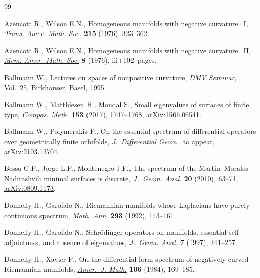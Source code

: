 \documentclass[pdftex]{sigma}
\numberwithin{equation}{section}
\begin{document}
\begin{thebibliography}{99}
\footnotesize\itemsep=0pt

Azencott R., Wilson E.N., Homogeneous manifolds with negative curvature.~{I},
 \href{https://doi.org/10.2307/1999731}{\textit{Trans. Amer. Math. Soc.}} \textbf{215} (1976), 323--362.

Azencott R., Wilson E.N., Homogeneous manifolds with negative curvature.~{II},
 \href{https://doi.org/10.1090/memo/0178}{\textit{Mem. Amer. Math. Soc.}} \textbf{8} (1976), iii+102~pages.

Ballmann W., Lectures on spaces of nonpositive curvature, \textit{DMV Seminar},
 Vol.~25, \href{https://doi.org/10.1007/978-3-0348-9240-7}{{Birkh\"auser}}, Basel, 1995.

Ballmann W., Matthiesen H., Mondal S., Small eigenvalues of surfaces of finite
 type, \href{https://doi.org/10.1112/S0010437X17007291}{\textit{Compos. Math.}} \textbf{153} (2017), 1747--1768,
 \href{https://arxiv.org/abs/1506.06541}{arXiv:1506.06541}.

Ballmann W., Polymerakis P., On the essential spectrum of differential
 operators over geometrically finite orbifolds, \textit{J.~Differential Geom.},
 {t}o appear, \href{https://arxiv.org/abs/2103.13704}{arXiv:2103.13704}.

Bessa G.P., Jorge L.P., Montenegro J.F., The spectrum of the
 {M}artin--{M}orales--{N}adirashvili minimal surfaces is discrete,
 \href{https://doi.org/10.1007/s12220-009-9101-z}{\textit{J.~Geom. Anal.}} \textbf{20} (2010), 63--71, \href{https://arxiv.org/abs/0809.1173}{arXiv:0809.1173}.

Donnelly H., Garofalo N., Riemannian manifolds whose {L}aplacians have purely
 continuous spectrum, \href{https://doi.org/10.1007/BF01444709}{\textit{Math. Ann.}} \textbf{293} (1992), 143--161.

Donnelly H., Garofalo N., Schr\"odinger operators on manifolds, essential
 self-adjointness, and absence of eigenvalues, \href{https://doi.org/10.1007/BF02921722}{\textit{J.~Geom. Anal.}}
 \textbf{7} (1997), 241--257.

Donnelly H., Xavier F., On the differential form spectrum of negatively curved
 {R}iemannian manifolds, \href{https://doi.org/10.2307/2374434}{\textit{Amer.~J. Math.}} \textbf{106} (1984),
 169--185.


\end{thebibliography}
\end{document}
